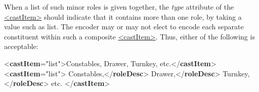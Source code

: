 When a list of such minor roles is given together, the {\itshape type} attribute of the \hyperref[TEI.castItem]{<castItem>} should indicate that it contains more than one role, by taking a value such as list. The encoder may or may not elect to encode each separate constituent within such a composite \hyperref[TEI.castItem]{<castItem>}. Thus, either of the following is acceptable: \par\bgroup{}\exampleFont \begin{shaded}\noindent\mbox{}{<\textbf{castItem}\hspace*{1em}{type}="{list}">}Constables, Drawer, Turnkey, etc.{</\textbf{castItem}>}\mbox{}\newline 
{<\textbf{castItem}\hspace*{1em}{type}="{list}">}\mbox{}\newline 
{}Constables,{</\textbf{roleDesc}>}\mbox{}\newline 
{}Drawer,{</\textbf{roleDesc}>}\mbox{}\newline 
{}Turnkey,{</\textbf{roleDesc}>}\mbox{}\newline 
 etc.\mbox{}\newline 
\mbox{}\newline 
{</\textbf{castItem}>}\end{shaded}\egroup\par \par
